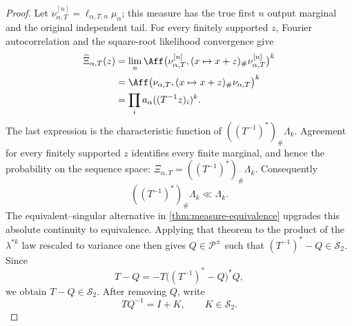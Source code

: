 \begin{proof}
Let \(\nu_{\alpha,T}^{[n]}=\ell_{\alpha,T,n}\mu_\alpha\); this measure has the true first \(n\)
output marginal and the original independent tail.
For every finitely supported \(z\), Fourier autocorrelation and
the square-root likelihood convergence give
\begin{align*}
 \widehat\Xi_{\alpha,T}(z)
 &=\lim_n\Aff\bigl(\nu_{\alpha,T}^{[n]},
             (x\mapsto x+z)_\#\nu_{\alpha,T}^{[n]}\bigr)^k\\
 &=\Aff\bigl(\nu_{\alpha,T},
        (x\mapsto x+z)_\#\nu_{\alpha,T}\bigr)^k\\
 &=\prod_i a_\alpha((T^{-1}z)_i)^k.
\end{align*}
The last expression is the characteristic function of
\(((T^{-1})^*)_\#\Lambda_k\).  Agreement for every finitely supported \(z\)
identifies every finite marginal, and hence the probability on the sequence
space:
\(\Xi_{\alpha,T}=((T^{-1})^*)_\#\Lambda_k\).
Consequently
\begin{equation}
 ((T^{-1})^*)_\#\Lambda_k\ll\Lambda_k.
 \label{eq:stable-fourier-transfer}
\end{equation}
The equivalent--singular alternative in \cref{thm:measure-equivalence}
upgrades this absolute continuity to equivalence.  Applying that theorem to
the product of the \(\lambda^{*k}\) law rescaled to variance one then gives
\(Q\in\mathcal P^{\pm}\) such that
\((T^{-1})^*-Q\in\mathcal S_2\).
Since
\[
 T-Q=-T\bigl((T^{-1})^*-Q\bigr)^*Q,
\]
we obtain \(T-Q\in\mathcal S_2\).
After removing \(Q\), write
\begin{equation}
 TQ^{-1}=I+K,
 \qquad K\in\mathcal S_2.
 \label{eq:stable-hilbert-schmidt-match}
\end{equation}


\end{proof}
